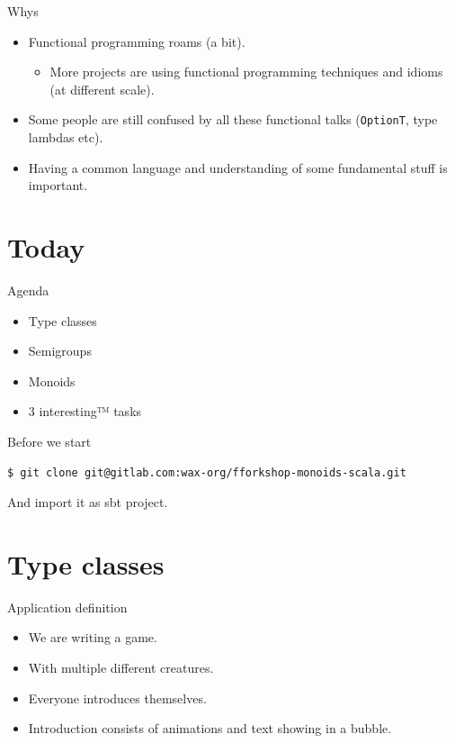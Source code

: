 \documentclass[presentation,aspectratio=169,smaller]{beamer}
\begin{document}
\begin{frame}[label={sec:orgc94e87c},fragile]{Whys}
 \begin{itemize}
\item <1-> Functional programming roams (a bit).
\begin{itemize}
\item More projects are using functional programming techniques and idioms (at
different scale).
\end{itemize}
\item <2-> Some people are still confused by all these functional talks (\texttt{OptionT}, type
lambdas etc).
\item <3-> Having a common language and understanding of some fundamental stuff is
important.
\end{itemize}
\end{frame}

\section*{Today}
\label{sec:orge3c4ad9}
\begin{frame}[label={sec:org9b342f5}]{Agenda}
\begin{itemize}
\item Type classes
\item Semigroups
\item Monoids
\item 3 interesting™ tasks
\end{itemize}
\end{frame}

\begin{frame}[label={sec:org4e20784},fragile]{Before we start}
 \begin{verbatim}
$ git clone git@gitlab.com:wax-org/fforkshop-monoids-scala.git
\end{verbatim}

And import it as sbt project.
\end{frame}

\section{Type classes}
\label{sec:orgeafa7d6}

\begin{frame}[label={sec:orgcd6121f}]{Application definition}
\begin{itemize}
\item We are writing a game.
\item With multiple different creatures.
\item Everyone introduces themselves.
\item Introduction consists of animations and text showing in a bubble.
\end{itemize}
\end{frame}
\end{document}

